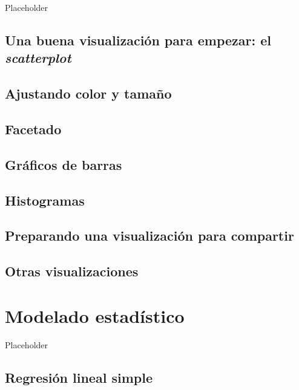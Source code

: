 \documentclass[]{book}
\begin{document}
Placeholder

\section{\texorpdfstring{Una buena visualización para empezar: el
\emph{scatterplot}}{Una buena visualización para empezar: el scatterplot}}\label{una-buena-visualizacion-para-empezar-el-scatterplot}

\section{Ajustando color y tamaño}\label{ajustando-color-y-tamano}

\section{Facetado}\label{facetado}

\section{Gráficos de barras}\label{graficos-de-barras}

\section{Histogramas}\label{histogramas}

\section{Preparando una visualización para
compartir}\label{preparando-una-visualizacion-para-compartir}

\section{Otras visualizaciones}\label{otras-visualizaciones}

\chapter{Modelado estadístico}\label{modelado-estadistico}

Placeholder

\section{Regresión lineal simple}\label{regresion-lineal-simple}
\end{document}
